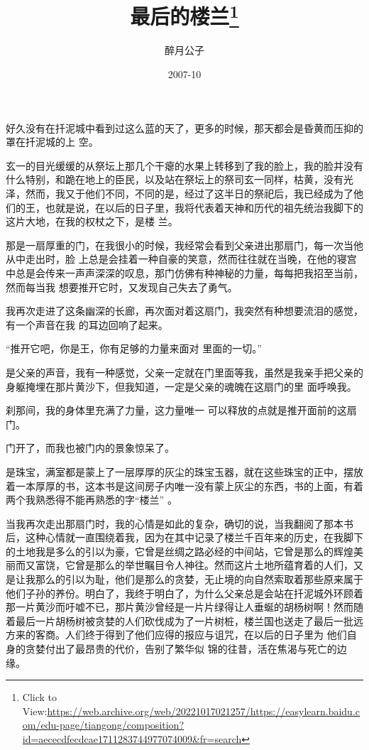 \documentclass{article}
\title{最后的楼兰\footnote{Click to View:\url{https://web.archive.org/web/20221017021257/https://easylearn.baidu.com/edu-page/tiangong/composition?id=aececdfecdcae1711283744977074009&fr=search}}}
\author{醉月公子}
\date{2007-10}
\begin{document}

\maketitle


\Large

好久没有在扦泥城中看到过这么蓝的天了，更多的时候，那天都会是昏黄而压抑的罩在扦泥城的上
空。 

玄一的目光缓缓的从祭坛上那几个干瘪的水果上转移到了我的脸上，我的脸并没有什么特别，和跪在地上的臣民，以及站在祭坛上的祭司玄一同样，枯黄，没有光泽，然而，我又于他们不同，不同的是，经过了这半日的祭祀后，我已经成为了他们的王，也就是说，在以后的日子里，我将代表着天神和历代的祖先统治我脚下的这片大地，在我的权杖之下，是楼
兰。 

那是一扇厚重的门，在我很小的时候，我经常会看到父亲进出那扇门，每一次当他从中走出时，脸
\newpage
上总是会挂着一种自豪的笑意，然而往往就在当晚，在他的寝宫中总是会传来一声声深深的叹息，那门仿佛有种神秘的力量，每每把我招至当前，然而每当我
想要推开它时，又发现自己失去了勇气。 

我再次走进了这条幽深的长廊，再次面对着这扇门，我突然有种想要流泪的感觉，有一个声音在我
的耳边回响了起来。 

“推开它吧，你是王，你有足够的力量来面对
里面的一切。” 

是父亲的声音，我有一种感觉，父亲一定就在门里面等我，虽然是我亲手把父亲的身躯掩埋在那片黄沙下，但我知道，一定是父亲的魂魄在这扇门的里
面呼唤我。 

刹那间，我的身体里充满了力量，这力量唯一
可以释放的点就是推开面前的这扇门。 


\newpage

门开了，而我也被门内的景象惊呆了。 

是珠宝，满室都是蒙上了一层厚厚的灰尘的珠宝玉器，就在这些珠宝的正中，摆放着一本厚厚的书，这本书是这间房子内唯一没有蒙上灰尘的东西，书的上面，有着两个我熟悉得不能再熟悉的字“楼兰”
。 

当我再次走出那扇门时，我的心情是如此的复杂，确切的说，当我翻阅了那本书后，这种心情就一直围绕着我，因为在其中记录了楼兰千百年来的历史，在我脚下的土地我是多么的引以为豪，它曾是丝绸之路必经的中间站，它曾是那么的辉煌美丽而又富饶，它曾是那么的举世瞩目令人神往。然而这片土地所蕴育着的人们，又是让我那么的引以为耻，他们是那么的贪婪，无止境的向自然索取着那些原来属于他们子孙的养份。明白了，我终于明白了，为什么父亲总是会站在扦泥城外环顾着那一片黄沙而吁嘘不已，那片黄沙曾经是一片片绿得让人垂蜒的胡杨树啊！然而随着最后一片胡杨树被贪婪的人们砍伐成为了一片树桩，楼兰国也送走了最后一批远方来的客商。人们终于得到了他们应得的报应与诅咒，在以后的日子里为
\newpage
他们自身的贪婪付出了最昂贵的代价，告别了繁华似
锦的往昔，活在焦渴与死亡的边缘。 
\end{document}
